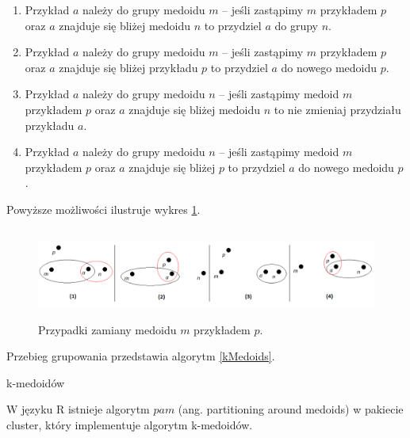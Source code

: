 \documentclass[11pt,a4paper,twoside]{article}
\begin{document}
\begin{enumerate}
\item Przykład $a$ należy do grupy medoidu $m$ -- jeśli zastąpimy $m$ przykładem $p$ oraz $a$ znajduje się bliżej medoidu $n$ to przydziel $a$ do grupy $n$.
\item Przykład $a$ należy do grupy medoidu $m$ -- jeśli zastąpimy $m$ przykładem $p$ oraz $a$ znajduje się bliżej przykładu $p$ to przydziel $a$ do nowego medoidu $p$.
\item Przykład $a$ należy do grupy medoidu $n$ -- jeśli zastąpimy medoid $m$ przykładem $p$ oraz $a$ znajduje się bliżej medoidu $n$ to nie zmieniaj przydziału przykładu $a$.
\item Przykład $a$ należy do grupy medoidu $n$ -- jeśli zastąpimy medoid $m$ przykładem $p$ oraz $a$ znajduje się bliżej $p$ to przydziel $a$ do nowego medoidu $p$.
\end{enumerate}

Powyższe możliwości ilustruje wykres \ref{kMedoidsSwap}.

\begin{figure}[ht]
\centering
\includegraphics[height=3cm, width=15.7cm]{kMedoids2}
\caption{Przypadki zamiany medoidu $m$ przykładem $p$.}
\label{kMedoidsSwap}
\end{figure}

Przebieg grupowania przedstawia algorytm \ref{kMedoids}.

\begin{algorithm}[ht]
\caption{k-medoidów}
\label{kMedoids}
	\begin{algorithmic}%
	\end{algorithmic}
\end{algorithm}

W języku R istnieje algorytm $pam$ (ang. partitioning around medoids) w pakiecie cluster, który implementuje algorytm k-medoidów.
\end{document}
